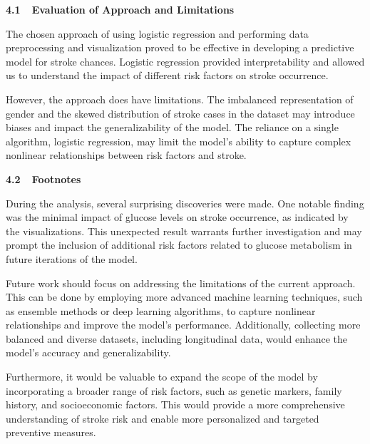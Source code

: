 \documentclass[letterpaper]{article}
\begin{document}
\bigskip

{
\textbf{4.1\ \ Evaluation of Approach and Limitations}}

{
The chosen approach of using logistic regression and performing data preprocessing and visualization proved to be
effective in developing a predictive model for stroke chances. Logistic regression provided interpretability and
allowed us to understand the impact of different risk factors on stroke occurrence.}


\bigskip

{
However, the approach does have limitations. The imbalanced representation of gender and the skewed distribution of
stroke cases in the dataset may introduce biases and impact the generalizability of the model. The reliance on a single
algorithm, logistic regression, may limit the model's ability to capture complex nonlinear relationships between risk
factors and stroke.}


\bigskip

{
\textbf{4.2\ \ Footnotes}}

{
During the analysis, several surprising discoveries were made. One notable finding was the minimal impact of glucose
levels on stroke occurrence, as indicated by the visualizations. This unexpected result warrants further investigation
and may prompt the inclusion of additional risk factors related to glucose metabolism in future iterations of the
model.}


\bigskip

{
Future work should focus on addressing the limitations of the current approach. This can be done by employing more
advanced machine learning techniques, such as ensemble methods or deep learning algorithms, to capture nonlinear
relationships and improve the model's performance. Additionally, collecting more balanced and diverse datasets,
including longitudinal data, would enhance the model's accuracy and generalizability.}


\bigskip

{
Furthermore, it would be valuable to expand the scope of the model by incorporating a broader range of risk factors,
such as genetic markers, family history, and socioeconomic factors. This would provide a more comprehensive
understanding of stroke risk and enable more personalized and targeted preventive measures.}

\bigskip
\end{document}
